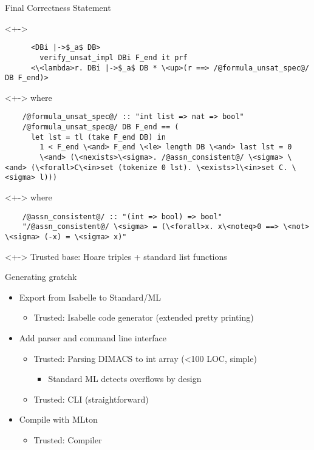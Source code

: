 \documentclass[fleqn]{beamer}
\begin{document}
\begin{frame}[fragile]{Final Correctness Statement}
  \begin{uncoverenv}<+->
  \begin{lstlisting}
      <DBi |->$_a$ DB> 
        verify_unsat_impl DBi F_end it prf
      <\<lambda>r. DBi |->$_a$ DB * \<up>(r ==> /@formula_unsat_spec@/ DB F_end)>
  \end{lstlisting}
  \end{uncoverenv}

  \begin{uncoverenv}<+->
  where
  \begin{lstlisting}
    /@formula_unsat_spec@/ :: "int list => nat => bool"
    /@formula_unsat_spec@/ DB F_end == (
      let lst = tl (take F_end DB) in
        1 < F_end \<and> F_end \<le> length DB \<and> last lst = 0 
        \<and> (\<nexists>\<sigma>. /@assn_consistent@/ \<sigma> \<and> (\<forall>C\<in>set (tokenize 0 lst). \<exists>l\<in>set C. \<sigma> l)))
  \end{lstlisting}
  \end{uncoverenv}

  \begin{uncoverenv}<+->
  where
  \begin{lstlisting}
    /@assn_consistent@/ :: "(int => bool) => bool"
    "/@assn_consistent@/ \<sigma> = (\<forall>x. x\<noteq>0 ==> \<not> \<sigma> (-x) = \<sigma> x)"
  \end{lstlisting}
  \end{uncoverenv}

  \begin{uncoverenv}<+->
  Trusted base: Hoare triples + standard list functions  
  \end{uncoverenv}
    
\end{frame}
\begin{frame}[fragile]{Generating gratchk}
  \begin{itemize}
   \item<+-> Export from Isabelle to Standard/ML
    \begin{itemize}
     \item Trusted: Isabelle code generator (extended pretty printing)
    \end{itemize}
   \item<+-> Add parser and command line interface
    \begin{itemize}
     \item Trusted: Parsing DIMACS to int array (<100 LOC, simple)
      \begin{itemize}
       \item Standard ML detects overflows by design
      \end{itemize}
     \item Trusted: CLI (straightforward)
    \end{itemize}
   \item<+-> Compile with MLton
    \begin{itemize}
     \item Trusted: Compiler

    \end{itemize}
  \end{itemize}
\end{frame}
\end{document}
